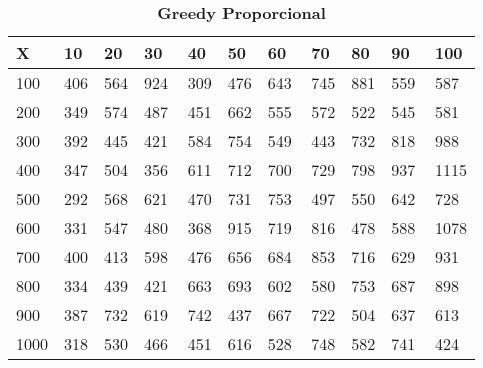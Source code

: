 \documentclass[10pt,letterpaper]{article}
\begin{document}
\begin{center}
\begin{table}\renewcommand{\arraystretch}{2.5}
\caption{\large \textbf{Greedy Proporcional}}
\centering
\begin{tabular} { |m{0.5cm}|m{1.3cm}|m{1.3cm}|m{1.3cm}|m{1.3cm}|m{1.3cm}|m{1.3cm}|m{1.3cm}|m{1.3cm}|m{1.3cm}|m{1.3cm}|} 
\hline
\rowcolor{Gray}
\centering \textbf{X} & \centering \textbf{10} & \centering \textbf{20} & \centering \textbf{30}\ & \centering \textbf{40} & \centering \textbf{50} & \centering \textbf{60}\ & \centering \textbf{70} & \centering \textbf{80} & \centering \textbf{90}\ & \textbf{100} \\\hline
\cellcolor{Gray}100 & \Large 406 & \Large 564 & \Large 924 & \Large 309 & \Large 476 & \Large 643 & \Large 745 & \Large 881 & \Large 559 & \Large 587 \\
\hline
\cellcolor{Gray}200 & \Large 349 & \Large 574 & \Large 487 & \Large 451 & \Large 662 & \Large 555 & \Large 572 & \Large 522 & \Large 545 & \Large 581 \\
\hline
\cellcolor{Gray}300 & \Large 392 & \Large 445 & \Large 421 & \Large 584 & \Large 754 & \Large 549 & \Large 443 & \Large 732 & \Large 818 & \Large 988 \\
\hline
\cellcolor{Gray}400 & \Large 347 & \Large 504 & \Large 356 & \Large 611 & \Large 712 & \Large 700 & \Large 729 & \Large 798 & \Large 937 & \Large 1115 \\
\hline
\cellcolor{Gray}500 & \Large 292 & \Large 568 & \Large 621 & \Large 470 & \Large 731 & \Large 753 & \Large 497 & \Large 550 & \Large 642 & \Large 728 \\
\hline
\cellcolor{Gray}600 & \Large 331 & \Large 547 & \Large 480 & \Large 368 & \Large 915 & \Large 719 & \Large 816 & \Large 478 & \Large 588 & \Large 1078 \\
\hline
\cellcolor{Gray}700 & \Large 400 & \Large 413 & \Large 598 & \Large 476 & \Large 656 & \Large 684 & \Large 853 & \Large 716 & \Large 629 & \Large 931 \\
\hline
\cellcolor{Gray}800 & \Large 334 & \Large 439 & \Large 421 & \Large 663 & \Large 693 & \Large 602 & \Large 580 & \Large 753 & \Large 687 & \Large 898 \\
\hline
\cellcolor{Gray}900 & \Large 387 & \Large 732 & \Large 619 & \Large 742 & \Large 437 & \Large 667 & \Large 722 & \Large 504 & \Large 637 & \Large 613 \\
\hline
\cellcolor{Gray}1000 & \Large 318 & \Large 530 & \Large 466 & \Large 451 & \Large 616 & \Large 528 & \Large 748 & \Large 582 & \Large 741 & \Large 424 \\
\hline
\end{tabular} \\
\end{table}
\end{center}
\end{document}

